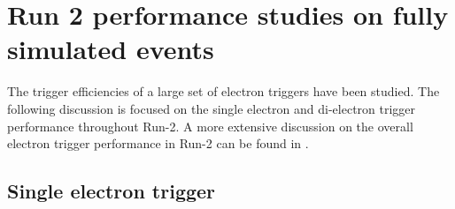 \section{Run 2 performance studies on fully simulated events}
\label{sec:trigg:fullsimPerformance}
The trigger efficiencies of a large set of electron triggers have been studied.  The following discussion is focused on the single electron and di-electron trigger performance throughout Run-2.  A more extensive discussion on the overall electron trigger performance in Run-2 can be found in \cite{TrigEgammaPaper}.
\subsection{Single electron trigger}

